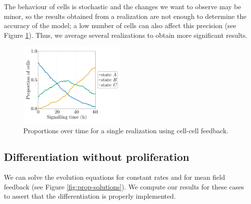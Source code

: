 The behaviour of cells is stochastic and the changes we want to observe may be minor, so the results obtained from a realization are not enough to determine the accuracy of the model; a low number of cells can also affect this precision (see Figure \ref{fig:prop-regu}). Thus, we average several realizations to obtain more significant results.

\begin{figure}[ht]
    \centering
    \includegraphics[width=0.47\textwidth]{figures/400/400-proportions-simulation-1ite-fp50-cellcell.png}
    \caption{Proportions over time for a single realization using cell-cell feedback.}
    \label{fig:prop-regu}
\end{figure}


\subsection{Differentiation without proliferation}

We can solve the evolution equations for constant rates and for mean field feedback (see Figure \ref{fig:prop-solutions}). We compute our results for these cases to assert that the differentiation is properly implemented.

